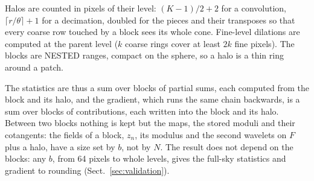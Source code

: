 \documentclass{aa}
\begin{document}
Halos are counted in pixels of their level: $(K-1)/2 + 2$ for a convolution, $\lceil r/\theta\rceil + 1$ for a decimation, doubled for the pieces and their transposes so that every coarse row touched by a block sees its whole cone. Fine-level dilations are computed at the parent level ($k$ coarse rings cover at least $2k$ fine pixels). The blocks are NESTED ranges, compact on the sphere, so a halo is a thin ring around a patch.

The statistics are thus a sum over blocks of partial sums, each computed from the block and its halo, and the gradient, which runs the same chain backwards, is a sum over blocks of contributions, each written into the block and its halo. Between two blocks nothing is kept but the maps, the stored moduli and their cotangents: the fields of a block, $z_n$, its modulus and the second wavelets on $F$ plus a halo, have a size set by $b$, not by $N$. The result does not depend on the blocks: any $b$, from 64 pixels to whole levels, gives the full-sky statistics and gradient to rounding (Sect.~\ref{sec:validation}).
\end{document}
